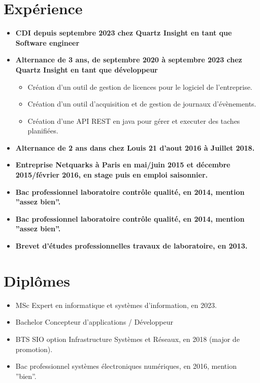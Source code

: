 \documentclass[10pt,a4paper,oneside]{article}
\begin{document}
\begin{multicols}{2}
\section*{Expérience}
\begin{itemize}
    \item \textbf{CDI depuis septembre 2023 chez Quartz Insight en tant que Software engineer}
    \item \textbf{Alternance de 3 ans, de septembre 2020 à septembre 2023 chez Quartz Insight en tant que développeur}
    \begin{itemize}
        \item Création d’un outil de gestion de licences pour le logiciel de l’entreprise.
        \item Création d’un outil d’acquisition et de gestion de journaux d’évènements.
        \item Création d’une API REST en java pour gérer et executer des taches planifiées.
    \end{itemize}
    \item \textbf{Alternance de 2 ans dans chez Louis 21 d’aout 2016 à Juillet 2018.}
    \item \textbf{Entreprise Netquarks à Paris en mai/juin 2015 et décembre 2015/février 2016, en stage puis en emploi saisonnier.}
    \item \textbf{Bac professionnel laboratoire contrôle qualité, en 2014, mention ”assez bien”.}
    \item \textbf{Bac professionnel laboratoire contrôle qualité, en 2014, mention ”assez bien”.}
    \item \textbf{Brevet d’études professionnelles travaux de laboratoire, en 2013.}
\end{itemize}

\section*{Diplômes}
\begin{itemize}
    \item MSc Expert en informatique et systèmes d’information, en 2023.
    \item Bachelor Concepteur d’applications / Développeur
    \item BTS SIO option Infrastructure Systèmes et Réseaux, en 2018 (major de promotion).
    \item Bac professionnel systèmes électroniques numériques, en 2016, mention ”bien”.
\end{itemize}


\end{multicols}
\end{document}
